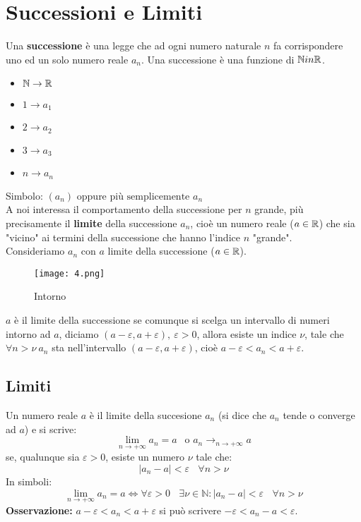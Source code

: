\section{Successioni e Limiti}
Una \textbf{successione} è una legge che ad ogni numero naturale $n$ fa
corrispondere uno ed un solo numero reale $a_n$. Una successione è una funzione
di $\mathbb{N} in \mathbb{R}$.
\begin{itemize}
    \item $\mathbb{N} \to \mathbb{R}$
    \item $1 \to a_1$
    \item $2 \to a_2$
    \item $3 \to a_3$
    \item $n \to a_n$
\end{itemize}
Simbolo: $(a_n) \text{ oppure più semplicemente } a_n$\\
A noi interessa il comportamento della successione per $n$ grande, più precisamente il \textbf{limite} della successione $a_n$, cioè un numero reale ($a \in \mathbb{R}$) che sia "vicino" ai termini della successione che hanno l'indice $n$ "grande".\\
Consideriamo $a_n$ con $a$ limite della successione ($a \in \mathbb{R}$).
\begin{figure}[h!]
    \centering
    \texttt{[image: 4.png]}
    \caption{Intorno}
    \label{fig:4}
\end{figure}
$a$ è il limite della successione se comunque si scelga un intervallo di numeri intorno ad $a$, diciamo $(a-\varepsilon, a+\varepsilon), \ \varepsilon > 0$, allora esiste un indice $\nu$, tale che $\forall n > \nu \ a_n$ sta nell'intervallo $(a-\varepsilon, a+\varepsilon)$, cioè $a-\varepsilon < a_n < a+\varepsilon$.

\subsection{Limiti}
Un numero reale $a$ è il limite della succesione $a_n$ (si dice che $a_n$ tende
o converge ad $a$) e si scrive:
\[
    \lim_{n\to +\infty} a_n = a \ \ \text{ o } a_n \to_{n\to+\infty} a
\]
se, qualunque sia $\varepsilon > 0$, esiste un numero $\nu$ tale che:
\[
    |a_n - a| < \varepsilon \ \ \ \ \forall n > \nu
\]
In simboli:
\[
    \lim_{n\to+\infty}a_n = a \iff \forall \varepsilon > 0 \ \ \ \ \exists \nu \in \mathbb{N} : |a_n - a| < \varepsilon \ \ \ \ \forall n > \nu
\]
\textbf{Osservazione:} $a-\varepsilon < a_n < a+\varepsilon$ si può scrivere $-\varepsilon < a_n - a < \varepsilon$.\\
